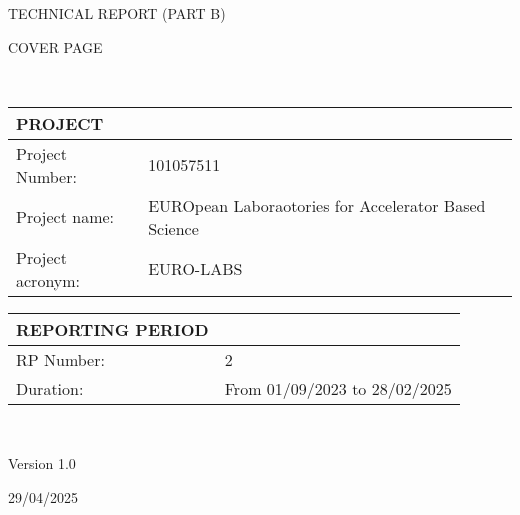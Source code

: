 %
%


\vspace*{-0.05cm}

{\fontsize{12}{15}\bf\color{mycayenne}
        \centerline{TECHNICAL REPORT (PART B)}
        
        COVER PAGE}\\%
  \setlength{\parindent}{0pt}
  
  \def\arraystretch{1.25}
  {\fontsize{9}{11}\selectfont
  \begin{tabular}[t]{!{\color{mygray}\vrule}p{.25\linewidth}!{\color{mygray}\vrule}p{.6885\linewidth}!{\color{mygray}\vrule}} \hline
    {\rule{0pt}{2.5ex}\color{myblack}\bf PROJECT} \\ \hline
    Project Number: & 101057511 \\ \hline
    Project name: & EUROpean Laboraotories for Accelerator Based Science \\ \hline
    Project acronym: & EURO-LABS \\
    \hline
  \end{tabular}

  \vspace*{1cm}
  
  \begin{tabular}[t]{!{\color{mygray}\vrule}p{.25\linewidth}!{\color{mygray}\vrule}p{.6885\linewidth}!{\color{mygray}\vrule}} \hline
    {\rule{0pt}{2.5ex}\color{myblack}\bf REPORTING PERIOD} \\ \hline
    RP Number: & 2 \\ \hline
    Duration: & From 01/09/2023 to 28/02/2025 \\ \hline
  \end{tabular}
}\\[3ex]

\begin{center}
    \vspace*{2cm}
    
    Version 1.0
    
    \vspace*{0.5cm}
    29/04/2025
    
\end{center}
\clearpage
\restoregeometry